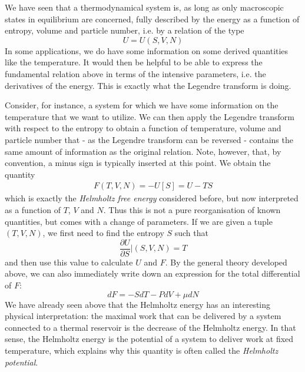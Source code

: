 \documentclass[a4paper, draft]{article}
\theoremstyle{own}
\theoremstyle{remark}
\begin{document}
We have seen that a thermodynamical system is, as long as only macroscopic states in equilibrium are concerned, fully described by the energy as a function of entropy, volume and particle number, i.e. by a relation of the type
$$
U = U(S,V,N)
$$
In some applications, we do have some information on some derived quantities like the temperature. It would then be helpful to be able to express the fundamental relation above in terms of the intensive parameters, i.e. the derivatives of the energy. This is exactly what the Legendre transform is doing.

Consider, for instance, a system for which we have some information on the temperature that we want to utilize. We can then apply the Legendre transform with respect to the entropy to obtain a function of temperature, volume and particle number that - as the Legendre transform can be reversed - contains the same amount of information as the original relation. Note, however, that, by convention, a minus sign is typically inserted at this point. We obtain the quantity
\begin{align}\label{eq:helmholtzenergy}
F(T,V,N) = -U[S] = U - TS
\end{align}
which is exactly the {\em Helmholtz free energy} considered before, but now interpreted as a function of $T$, $V$ and $N$. Thus this is not a pure reorganisation of known quantities, but comes with a change of parameters. If we are given a tuple $(T,V,N)$, we first need to find the entropy $S$ such that 
$$
\frac{\partial U}{\partial S} | (S,V,N) = T
$$
and then use this value to calculate $U$ and $F$. By the general theory developed above, we can also immediately write down an expression for the total 
differential of $F$:
$$
dF = - S dT - PdV + \mu dN
$$
We have already seen above that the Helmholtz energy has an interesting physical interpretation: the maximal work that can be delivered by a system connected to a thermal reservoir is the decrease of the Helmholtz energy. In that sense, the Helmholtz energy is the potential of a system to deliver work at fixed temperature, which explains why this quantity is often called the {\em Helmholtz potential}.
\end{document}
